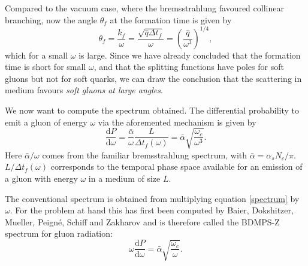 \documentclass[a4paper,12pt]{article}
\numberwithin{equation}{section}
\begin{document}
Compared to the vacuum case, where the bremsstrahlung favoured collinear branching, now the angle $\theta_f$ at the formation time is given by
\begin{equation}
\theta_f=\frac{k_f}{\omega}=\frac{\sqrt{\hat{q}\Delta t_f}}{\omega}=\left( \frac{\hat{q}}{\omega^3} \right)^{1/4},
\end{equation}
which for a small $\omega$ is large. Since we have already concluded that the formation time is short for small $\omega$, and that the splitting functions have poles for soft gluons but not for soft quarks, we can draw the conclusion that the scattering in medium favours \emph{soft gluons at large angles}.



We now want to compute the spectrum obtained. The differential probability to emit a gluon of energy $\omega$ via the aforemented mechanism is given by 
\begin{equation}\label{spectrum}
\frac{\mathrm{d}P}{\mathrm{d}\omega} =\frac{\bar{\alpha}}{\omega}\frac{L}{\Delta t_f(\omega)}= \bar{\alpha}\sqrt{\frac{\omega_c}{\omega^3}}.
\end{equation}
Here ${\bar{\alpha}}/{\omega}$ comes from the familiar bremsstrahlung spectrum, with $\bar{\alpha}={\alpha_s N_c}/{\pi}$. ${L}/{\Delta t_f(\omega)}$ corresponds to the temporal phase space available for an emission of a gluon with energy $\omega$ in a medium of size $L$. 

The conventional spectrum is obtained from multiplying equation \eqref{spectrum} by $\omega$. For the problem at hand this has first been computed by Baier, Dokshitzer, Mueller, Peigné, Schiff and Zakharov and is therefore called the BDMPS-Z spectrum for gluon radiation\cite{Baier:1996kr,Zakharov:1997uu}:
\begin{equation}\label{BDMPS}
\omega \frac{\mathrm{d}P}{\mathrm{d}\omega} =\bar{\alpha}\sqrt{\frac{\omega_c}{\omega}}.
\end{equation}
\end{document}

